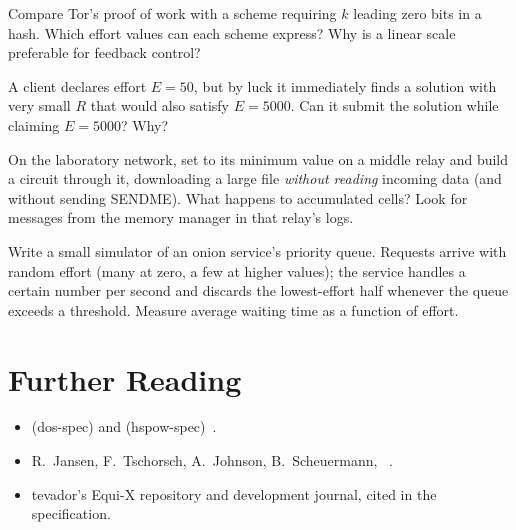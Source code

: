 \begin{esercizio}[2]\label{es:15-bit}
Compare Tor's proof of work with a scheme requiring $k$ leading zero bits in a hash. Which effort values can each scheme express? Why is a linear scale preferable for feedback control?
\end{esercizio}

\begin{esercizio}[2]\label{es:15-sforzo}
A client declares effort $E = 50$, but by luck it immediately finds a solution with very small $R$ that would also satisfy $E = 5000$. Can it submit the solution while claiming $E = 5000$? Why?
\end{esercizio}

\begin{esercizio}[3]\label{es:15-oom}
On the laboratory network, set  to its minimum value on a middle relay and build a circuit through it, downloading a large file \emph{without reading} incoming data (and without sending SENDME). What happens to accumulated cells? Look for messages from the memory manager in that relay's logs.
\end{esercizio}

\begin{esercizio}[3]\label{es:15-coda}
Write a small simulator of an onion service's priority queue. Requests arrive with random effort (many at zero, a few at higher values); the service handles a certain number per second and discards the lowest-effort half whenever the queue exceeds a threshold. Measure average waiting time as a function of effort.
\end{esercizio}

\section*{Further Reading}
\begin{itemize}
  \item {} (dos-spec) and  (hspow-spec)~\cite{torspec}.
  \item R.~Jansen, F.~Tschorsch, A.~Johnson, B.~Scheuermann, ~\cite{jansen2014sniper}.
  \item tevador's Equi-X repository and development journal, cited in the specification.
\end{itemize}
